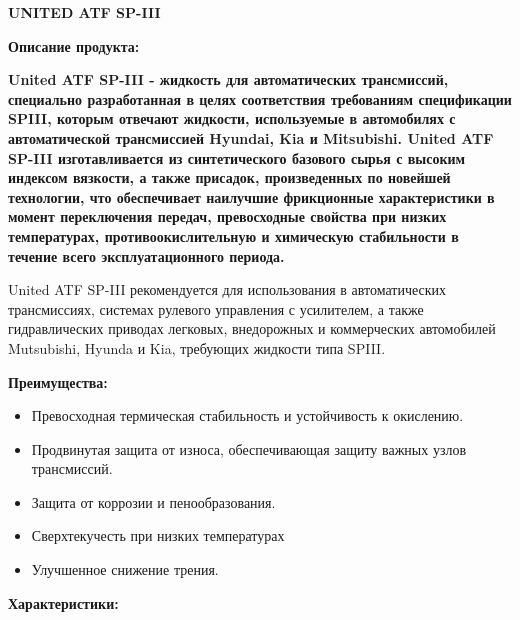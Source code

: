 \documentclass[12pt,a4paper]{article}
\begin{document}
\begin{spacing}{2.5}
{\textbf{\fontsize{20pt}{30pt}\selectfont UNITED ATF SP-III}}
\end{spacing}

\begin{spacing}{2.5}
{\textbf{\fontsize{14pt}{4pt}\selectfont Описание продукта:}}
\end{spacing}

{\textbf{United ATF SP-III - жидкость для автоматических трансмиссий, специально разработанная в целях соответствия требованиям спецификации SPIII, которым отвечают жидкости, используемые в автомобилях с автоматической трансмиссией Hyundai, Kia и Mitsubishi.  United ATF SP-III изготавливается из синтетического базового сырья с высоким индексом вязкости, а также присадок, произведенных по новейшей технологии, что обеспечивает наилучшие фрикционные характеристики в момент переключения передач, превосходные свойства при низких температурах, противоокислительную и химическую стабильности в течение всего эксплуатационного периода. }

United ATF SP-III рекомендуется для использования в автоматических трансмиссиях, системах рулевого управления с усилителем, а также гидравлических приводах легковых, внедорожных и коммерческих автомобилей Mutsubishi, Hyunda и Kia, требующих жидкости типа SPIII.

\bigskip
{\textbf{\fontsize{14pt}{10pt}\selectfont Преимущества:}}

\begin{itemize}[itemsep=1.4pt]

\item  Превосходная термическая стабильность и устойчивость к окислению.
\item  Продвинутая защита от износа, обеспечивающая защиту важных узлов трансмиссий.
\item  Защита от коррозии и пенообразования.
\item  Сверхтекучесть при низких температурах
\item  Улучшенное снижение трения.
 
\end{itemize}

\begin{spacing}{1}
{\textbf{\fontsize{14pt}{4pt}\selectfont Характеристики:}}
\end{spacing}

}
\end{document}
